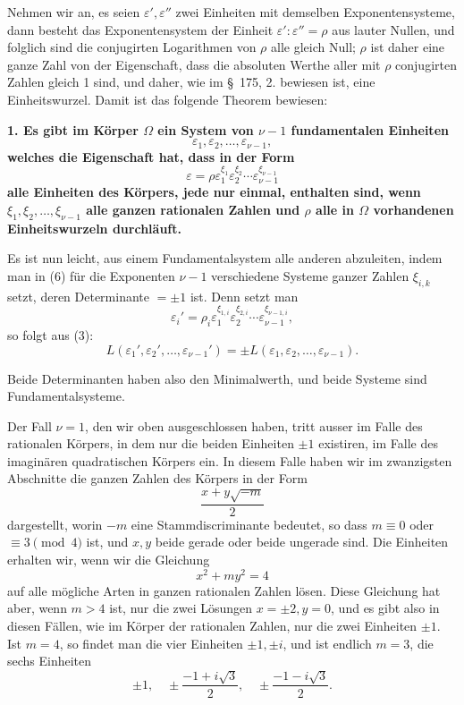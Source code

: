 \documentclass[11pt]{article}
\begin{document}
Nehmen wir an, es seien $\varepsilon',\varepsilon''$ zwei Einheiten mit demselben Exponentensysteme, dann besteht das Exponentensystem der Einheit $\varepsilon':\varepsilon''=\rho$ aus lauter Nullen, und folglich sind die conjugirten Logarithmen von $\rho$ alle gleich Null; $\rho$ ist daher eine ganze Zahl von der Eigenschaft, dass die absoluten Werthe aller mit $\rho$ conjugirten Zahlen gleich 1 sind, und daher, wie im \S~175, 2. bewiesen ist, eine Einheitswurzel. Damit ist das folgende Theorem bewiesen:

\textbf{1. Es gibt im Körper $\Omega$ ein System von $\nu-1$ fundamentalen Einheiten}
\begin{equation}
\varepsilon_1,\varepsilon_2,\ldots,\varepsilon_{\nu-1},
\tag{5}
\end{equation}
\textbf{welches die Eigenschaft hat, dass in der Form}
\begin{equation}
\varepsilon=\rho\varepsilon_1^{\xi_1}\varepsilon_2^{\xi_2}\cdots\varepsilon_{\nu-1}^{\xi_{\nu-1}}
\tag{6}
\end{equation}
\textbf{alle Einheiten des Körpers, jede nur einmal, enthalten sind, wenn $\xi_1,\xi_2,\ldots,\xi_{\nu-1}$ alle ganzen rationalen Zahlen und $\rho$ alle in $\Omega$ vorhandenen Einheitswurzeln durchläuft.}

Es ist nun leicht, aus einem Fundamentalsystem alle anderen abzuleiten, indem man in (6) für die Exponenten $\nu-1$ verschiedene Systeme ganzer Zahlen $\xi_{i,k}$ setzt, deren Determinante $=\pm1$ ist. Denn setzt man
\[
\varepsilon_i'=\rho_i\varepsilon_1^{\xi_{1,i}}\varepsilon_2^{\xi_{2,i}}\cdots\varepsilon_{\nu-1}^{\xi_{\nu-1,i}},
\]
so folgt aus (3):
\[
L(\varepsilon_1',\varepsilon_2',\ldots,\varepsilon_{\nu-1}')=\pm L(\varepsilon_1,\varepsilon_2,\ldots,\varepsilon_{\nu-1}).
\]

Beide Determinanten haben also den Minimalwerth, und beide Systeme sind Fundamentalsysteme.

Der Fall $\nu=1$, den wir oben ausgeschlossen haben, tritt ausser im Falle des rationalen Körpers, in dem nur die beiden Einheiten $\pm1$ existiren, im Falle des imaginären quadratischen Körpers ein. In diesem Falle haben wir im zwanzigsten Abschnitte die ganzen Zahlen des Körpers in der Form
\[
\frac{x+y\sqrt{-m}}{2}
\]
dargestellt, worin $-m$ eine Stammdiscriminante bedeutet, so dass $m\equiv0$ oder $\equiv3\pmod 4$ ist, und $x,y$ beide gerade oder beide ungerade sind. Die Einheiten erhalten wir, wenn wir die Gleichung
\[
x^2+my^2=4
\]
auf alle mögliche Arten in ganzen rationalen Zahlen lösen. Diese Gleichung hat aber, wenn $m>4$ ist, nur die zwei Lösungen $x=\pm2,y=0$, und es gibt also in diesen Fällen, wie im Körper der rationalen Zahlen, nur die zwei Einheiten $\pm1$. Ist $m=4$, so findet man die vier Einheiten $\pm1,\pm i$, und ist endlich $m=3$, die sechs Einheiten
\[
\pm1,
\quad \pm\frac{-1+i\sqrt3}{2},
\quad \pm\frac{-1-i\sqrt3}{2}.
\]
\end{document}
